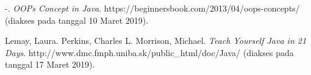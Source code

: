 \begin{thebibliography}{9}

-. \textit{OOPs Concept in Java}. https://beginnersbook.com/2013/04/oops-concepts/ (diakses pada tanggal 10 Maret 2019).

Lemay, Laura. Perkins, Charles L. Morrison, Michael. \textit{Teach Yourself Java in 21 Days}. http://www.dmc.fmph.uniba.sk/public\_html/doc/Java/ (diakses pada tanggal 17 Maret 2019).

\end{thebibliography}